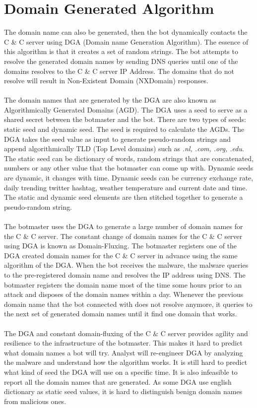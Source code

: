 \section{Domain Generated Algorithm}
The domain name can also be generated, then the bot dynamically contacts the C \& C server using DGA (Domain name Generation Algorithm). The essence of this algorithm is that it creates a set of random strings. The bot attempts to resolve the generated domain names by sending DNS queries until one of the domains resolves to the C \& C server IP Address. The domains that do not resolve will result in Non-Existent Domain (NXDomain) responses.\\\\ 
The domain names that are generated by the DGA are also known as Algorithmically Generated Domains (AGD). The DGA uses a seed to serve as a shared secret between the botmaster and the bot. There are two types of seeds: static seed and dynamic seed. The seed is required to calculate the AGDs. The DGA takes the seed value as input to generate pseudo-random strings and append algorithmically TLD (Top Level domains) such as \textit{.nl, .com, .org, .edu}. The static seed can be dictionary of words, random strings that are concatenated, numbers or any other value that the botmaster can come up with. Dynamic seeds are dynamic, it changes with time. Dynamic seeds can be currency exchange rate, daily trending twitter hashtag, weather temperature and current date and time.  The static and dynamic seed elements are then stitched together to generate a pseudo-random string.\\\\ 
The botmaster uses the DGA to generate a large number of domain names for the C \& C server.  The constant change of domain names for the C \& C server using DGA is known as Domain-Fluxing.  The botmaster registers one of the DGA created domain names for the C \& C server in advance using the same algorithm of the DGA.  When the bot receives the malware, the malware queries to the pre-registered domain name and resolves the IP address using DNS.  The botmaster registers the domain name most of the time some hours prior to an attack and disposes of the domain names within a day.  Whenever the previous domain name that the bot connected with does not resolve anymore, it queries to the next set of generated domain names until it find one domain that works.\\\\ 
The DGA and constant domain-fluxing of the C \& C server provides agility and resilience to the infrastructure of the botmaster.  This makes it hard to predict what domain names a bot will try. Analyst will re-engineer DGA by analyzing the malware and understand how the algorithm works. It is still hard to predict what kind of seed the DGA will use on a specific time. It is also infeasible to report all the domain names that are generated. As some DGA use english dictionary as static seed values, it is hard to distinguish benign domain names from malicious ones. 

